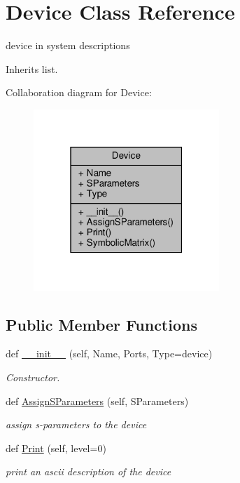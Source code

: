 \hypertarget{classSignalIntegrity_1_1SystemDescriptions_1_1Device_1_1Device}{}\section{Device Class Reference}
\label{classSignalIntegrity_1_1SystemDescriptions_1_1Device_1_1Device}


device in system descriptions  




Inherits list.



Collaboration diagram for Device\+:\nopagebreak
\begin{figure}[H]
\begin{center}
\leavevmode
\includegraphics[width=199pt]{classSignalIntegrity_1_1SystemDescriptions_1_1Device_1_1Device__coll__graph}
\end{center}
\end{figure}
\subsection*{Public Member Functions}
\begin{DoxyCompactItemize}
\item 
def \hyperlink{classSignalIntegrity_1_1SystemDescriptions_1_1Device_1_1Device_aa13732b8be1d26511f983436259d282f}{\+\_\+\+\_\+init\+\_\+\+\_\+} (self, Name, Ports, Type=\textquotesingle{}device\textquotesingle{})
\begin{DoxyCompactList}\small\item\em Constructor. \end{DoxyCompactList}\item 
def \hyperlink{classSignalIntegrity_1_1SystemDescriptions_1_1Device_1_1Device_ac588a4be7e9067cb86aed0fc706f4902}{Assign\+S\+Parameters} (self, S\+Parameters)
\begin{DoxyCompactList}\small\item\em assign s-\/parameters to the device \end{DoxyCompactList}\item 
def \hyperlink{classSignalIntegrity_1_1SystemDescriptions_1_1Device_1_1Device_a891ce4dff358dfe4f73c3c0e269bcffd}{Print} (self, level=0)
\begin{DoxyCompactList}\small\item\em print an ascii description of the device \end{DoxyCompactList}\end{DoxyCompactItemize}
